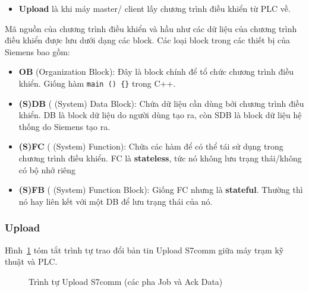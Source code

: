 \documentclass[../main.tex]{subfiles}
\begin{document}
\begin{itemize}
    \item \textbf{Upload} là khi máy master/ client lấy chương trình điều khiển từ PLC về.
\end{itemize}


Mã nguồn của chương trình điều khiển và hầu như các dữ liệu của chương trình điều khiển được lưu dưới dạng các block. Các loại block trong các thiết bị của Siemens bao gồm:


\begin{itemize}
    \item \textbf{OB} (Organization Block): Đây là block chính để tổ chức chương trình điều khiển. Giống hàm \texttt{main () \{\}} trong C++.
\end{itemize}


\begin{itemize}
    \item \textbf{(S)DB} ( (System) Data Block): Chứa dữ liệu cần dùng bởi chương trình điều khiển. DB là block dữ liệu do người dùng tạo ra, còn SDB là block dữ liệu hệ thống do Siemens tạo ra.
\end{itemize}


\begin{itemize}
    \item \textbf{(S)FC} ( (System) Function): Chứa các hàm để có thể tái sử dụng trong chương trình điều khiển. FC là \textbf{stateless}, tức nó không lưu trạng thái/không có bộ nhớ riêng
\end{itemize}


\begin{itemize}
    \item \textbf{(S)FB} ( (System) Function Block): Giống FC nhưng là \textbf{stateful}. Thường thì nó hay liên kết với một DB để lưu trạng thái của nó.
\end{itemize}



\subsubsection{Upload}



Hình~\ref{fig:s7-upload-sequence} tóm tắt trình tự trao đổi bản tin Upload S7comm giữa máy trạm kỹ thuật và PLC.

\begin{figure}[htbp]
    \centering
    \SSevenUploadSequence
    \caption{Trình tự Upload S7comm (các pha Job và Ack Data)}
    \label{fig:s7-upload-sequence}
\end{figure}
\end{document}
